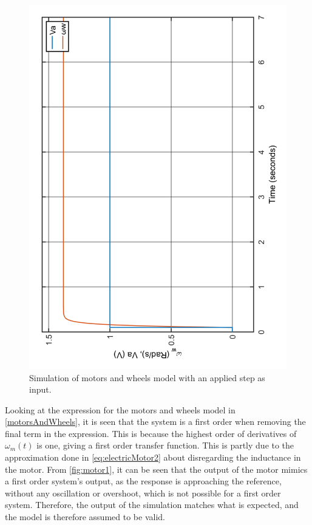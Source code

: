 \begin{figure}[H]
\centering
\includegraphics[height = 0.75\textwidth, angle = -90]{figures/motor1.pdf}
\caption{Simulation of motors and wheels model with an applied step as input.}
\label{fig:motor1}
\end{figure}
Looking at the expression for the motors and wheels model in \autoref{motorsAndWheels}, it is seen that the system is a first order when removing the final term in the expression. This is because the highest order of derivatives of $\omega_m(t)$ is one, giving a first order transfer function. This is partly due to the approximation done in \autoref{eq:electricMotor2} about disregarding the inductance in the motor.
From \autoref{fig:motor1}, it can be seen that the output of the motor mimics a first order system's output, as the response is approaching the reference, without any oscillation or overshoot, which is not possible for a first order system. Therefore, the output of the simulation matches what is expected, and the model is therefore assumed to be valid.

